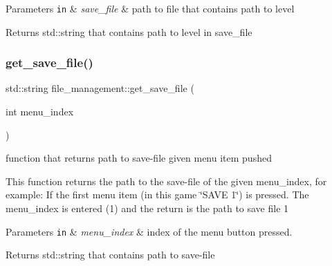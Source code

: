 \begin{DoxyParams}[1]{Parameters}
\mbox{\tt in}  & {\em save\+\_\+file} & path to file that contains path to level\\
\hline
\end{DoxyParams}
\begin{DoxyReturn}{Returns}
std\+::string that contains path to level in save\+\_\+file 
\end{DoxyReturn}
\mbox{\label{classfile__management_a92ece2d05964c828dcb9bf6c59043327}} 
\subsubsection{\texorpdfstring{get\+\_\+save\+\_\+file()}{get\_save\_file()}}
{\footnotesize\ttfamily std\+::string file\+\_\+management\+::get\+\_\+save\+\_\+file (\begin{DoxyParamCaption}\item[{int}]{menu\+\_\+index }\end{DoxyParamCaption})}



function that returns path to save-\/file given menu item pushed 

This function returns the path to the save-\/file of the given menu\+\_\+index, for example\+: If the first menu item (in this game \char`\"{}\+S\+A\+V\+E 1\char`\"{}) is pressed. The menu\+\_\+index is entered (1) and the return is the path to save file 1


\begin{DoxyParams}[1]{Parameters}
\mbox{\tt in}  & {\em menu\+\_\+index} & index of the menu button pressed.\\
\hline
\end{DoxyParams}
\begin{DoxyReturn}{Returns}
std\+::string that contains path to save-\/file 
\end{DoxyReturn}
\mbox{\label{classfile__management_a97eda13bca5dbe703663bf81f83a77a0}} 
